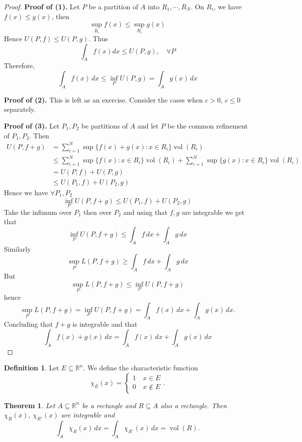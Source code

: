 \documentclass[11pt,openany]{book}
\theoremstyle{plain}
\newtheorem{theorem}{Theorem}[chapter]
\theoremstyle{definition}
\newtheorem{definition}{Definition}[chapter]
\theoremstyle{remark}
\newcommand{\R}{\mathbb{R}}
\newcommand{\set}[1]{\{ #1 \}}
\newcommand{\vol}{\operatorname{vol}}
\begin{document}
\begin{proof}
{\bf Proof of (1).}
    Let $P$ be a partition of $A$ into $R_1, \cdots, R_N$. On $R_i$, we have $f(x)\leq g(x)$, then 
    $$\sup_{R_i} f(x) \le \sup_{R_i} g(x)$$
    Hence $U(P,f) \le U(P,g).$
    Thus
    $$\int_A f(x) dx \le U(P,g), \quad \forall P$$
    Therefore,
    $$\int_A f(x)\, dx \le \inf_P U(P,g) = \int_A g(x)\, dx$$

{\bf Proof of (2).} This is left as an exercise. Consider the cases when $c>0$, $c\leq 0$ separately.

{\bf Proof of (3).} Let $P_1, P_2$ be partitions of $A$ and let $P$ be the common refinement of $P_1, P_2$. 
    Then
    \begin{align*}
        U(P,f+g) &= \sum_{i=1}^N \sup \set{f(x)+g(x):x\in R_i} \vol (R_i) \\
        &\le \sum_{i=1}^N \sup\{f(x):x\in R_i\}\vol(R_i) + \sum_{i=1}^N \sup\{g(x):x\in R_i\} \vol (R_i) \\
        &= U(P,f) + U(P,g) \\
        &\le U(P_1, f) + U(P_2, g)
    \end{align*}
    Hence we have $\forall P_1, P_2$
    $$\inf_P U(P,f+g) \le U(P_1, f) + U(P_2, g)$$
    Take the infimum over $P_1$ then over $P_2$ and using that $f, g$ are integrable we get that 
    $$\inf_P U(P, f+g) \le \int_A f\, dx + \int_A g\,dx$$
    Similarly 
    $$\sup_P L(P, f+g) \ge \int_A f\, dx + \int_A g\, dx$$
    But 
    $$\sup_P L(P,f+g) \le \inf_P U(P, f+g)$$
    hence 
    $$\sup_P L(P,f+g) = \inf_P U(P,f+g) = \int_A f(x)\, dx + \int_A g(x)\, dx.$$
    Concluding that $f+g$ is integrable and that 
    $$\int_A f(x)+g(x)\, dx=\int_A f(x)\, dx+\int_A g(x)\, dx$$
\end{proof}
 
\begin{definition}
    Let $E \subseteq \R^n$. We define the characteristic function 
    $$\chi_E(x) = \begin{cases}
        1 \quad x \in E \\
        0 \quad x \not\in E
    \end{cases}.$$
\end{definition}


\begin{theorem}
    Let $A \subseteq \R^n$ be a rectangle and $R \subseteq A$ also a rectangle. 
    Then $\chi_R(x), \ \chi_{R^\circ} (x)$ are integrable and 
    $$\int_A \chi_R(x)\, dx = \int_A \chi_{R^\circ} (x) \, dx = \vol (R).$$
\end{theorem}
\end{document}
